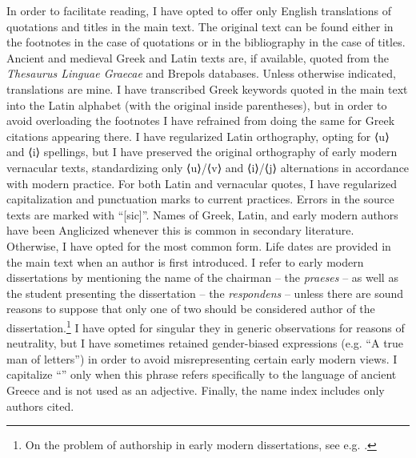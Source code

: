 \hypertarget{Toc19704800}{}
In order to facilitate reading, I have opted to offer only English translations of quotations and titles in the main text. The original text can be found either in the footnotes in the case of quotations or in the bibliography in the case of titles. Ancient and medieval Greek and Latin texts are, if available, quoted from the \textit{Thesaurus Linguae Graecae} and Brepols databases. Unless otherwise indicated, translations are mine. I have transcribed Greek keywords quoted in the main text into the Latin alphabet (with the original inside parentheses), but in order to avoid overloading the footnotes I have refrained from doing the same for Greek citations appearing there. I have regularized Latin orthography, opting for ⟨u⟩ and ⟨i⟩ spellings, but I have preserved the original orthography of early modern vernacular texts, standardizing only ⟨u⟩/⟨v⟩ and ⟨i⟩/⟨j⟩ alternations in accordance with modern practice. For both Latin and vernacular quotes, I have regularized capitalization and punctuation marks to current practices. Errors in the source texts are marked with “[sic]”. Names of Greek, Latin, and early modern authors have been Anglicized whenever this is common in secondary literature. Otherwise, I have opted for the most common form. Life dates are provided in the main text when an author is first introduced. I refer to early modern dissertations by mentioning the name of the chairman – the \textit{praeses} – as well as the student presenting the dissertation – the \textit{respondens} – unless there are sound reasons to suppose that only one of two should be considered author of the dissertation.\footnote{On the problem of authorship in early modern dissertations, see e.g. \citet{Considine2008b}.} I have opted for singular they in generic observations for reasons of neutrality, but I have sometimes retained gender-biased expressions (e.g. “A true man of letters”) in order to avoid misrepresenting certain early modern views. I capitalize “” only when this phrase refers specifically to the language of ancient Greece and is not used as an adjective. Finally, the name index includes only authors cited.
